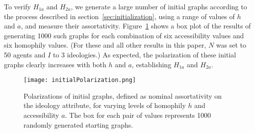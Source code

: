 
To verify $H_{1a}$ and $H_{2a}$, we generate a large number of initial graphs
according to the process described in section~\ref{sec:initialization}, using
a range of values of $h$ and $a$, and measure their assortativity.
Figure~\ref{fig:initialPolarization} shows a box plot of the results of
generating 1000 such graphs for each combination of six accessibility values
and six homophily values. (For these and all other results in this paper, $N$
was set to 50 agents and $I$ to 3 ideologies.) As expected, the polarization
of these initial graphs clearly increases with both $h$ and $a$, establishing
$H_{1a}$ and $H_{2a}$.

\begin{figure}
\centering
\texttt{[image: initialPolarization.png]}
\caption{Polarizations of initial graphs, defined as nominal assortativity on
the ideology attribute, for varying levels of homophily $h$ and accessibility
$a$. The box for each pair of values represents 1000 randomly generated
starting graphs.}
\label{fig:initialPolarization}
\end{figure}

